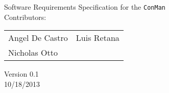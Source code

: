 \begin{titlepage}
\Huge
\vspace{2cm}
\begin{center}
Software Requirements Specification for the \texttt{ConMan}\\
\vspace{3cm}
\Large
Contributors:\\ 

\begin{tabular}{l l}\hline
Angel De Castro & Luis Retana\\
Nicholas Otto   & 
\end{tabular}
\vspace{1cm}

Version 0.1\\
10/18/2013
\end{center}


\end{titlepage}
